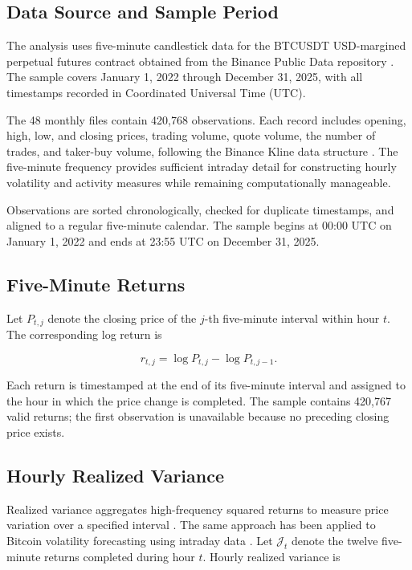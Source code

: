 \subsection{Data Source and Sample Period}

The analysis uses five-minute candlestick data for the
BTCUSDT USD-margined perpetual futures contract obtained from
the Binance Public Data repository
\citep{binancepublicdata}. The sample covers January 1, 2022
through December 31, 2025, with all timestamps recorded in
Coordinated Universal Time (UTC).

The 48 monthly files contain 420,768 observations. Each record
includes opening, high, low, and closing prices, trading
volume, quote volume, the number of trades, and taker-buy
volume, following the Binance Kline data structure
\citep{binancepublicdata}. The five-minute frequency provides
sufficient intraday detail for constructing hourly volatility
and activity measures while remaining computationally
manageable.

Observations are sorted chronologically, checked for duplicate
timestamps, and aligned to a regular five-minute calendar. The
sample begins at 00:00 UTC on January 1, 2022 and ends at
23:55 UTC on December 31, 2025.

\subsection{Five-Minute Returns}

Let \(P_{t,j}\) denote the closing price of the \(j\)-th
five-minute interval within hour \(t\). The corresponding log
return is

\begin{equation}
r_{t,j}
=
\log P_{t,j}
-
\log P_{t,j-1}.
\end{equation}

Each return is timestamped at the end of its five-minute
interval and assigned to the hour in which the price change is
completed. The sample contains 420,767 valid returns; the first
observation is unavailable because no preceding closing price
exists.

\subsection{Hourly Realized Variance}

Realized variance aggregates high-frequency squared returns to
measure price variation over a specified interval
\citep{andersen2003}. The same approach has been applied to
Bitcoin volatility forecasting using intraday data
\citep{bergsli2022}. Let \(\mathcal{J}_t\) denote the twelve
five-minute returns completed during hour \(t\). Hourly
realized variance is

